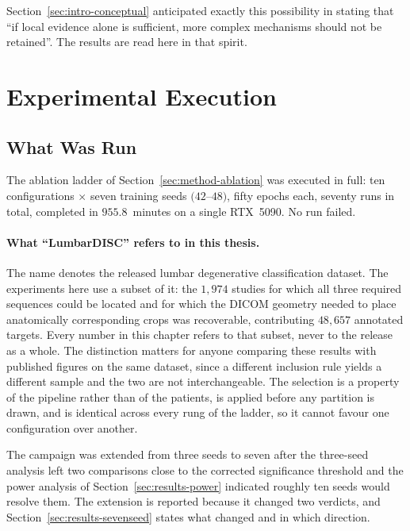 \documentclass[12pt,a4paper]{report}
\begin{document}
Section~\ref{sec:intro-conceptual} anticipated exactly this possibility in
stating that \enquote{if local evidence alone is sufficient, more complex
mechanisms should not be retained}. The results are read here in that spirit.

\section{Experimental Execution}
\label{sec:results-execution}

\subsection{What Was Run}

The ablation ladder of Section~\ref{sec:method-ablation} was executed in full:
ten configurations $\times$ seven training seeds $(42$--$48)$, fifty epochs
each, seventy runs in total, completed in $955.8$~minutes on a single RTX~5090.
No run failed.

\paragraph{What \enquote{LumbarDISC} refers to in this thesis.} The name
denotes the released lumbar degenerative classification dataset. The experiments
here use a subset of it: the $1{,}974$ studies for which all three required
sequences could be located and for which the DICOM geometry needed to place
anatomically corresponding crops was recoverable, contributing $48{,}657$
annotated targets. Every number in this chapter refers to that subset, never to
the release as a whole. The distinction matters for anyone comparing these
results with published figures on the same dataset, since a different inclusion
rule yields a different sample and the two are not interchangeable. The
selection is a property of the pipeline rather than of the patients, is applied
before any partition is drawn, and is identical across every rung of the ladder,
so it cannot favour one configuration over another.

The campaign was extended from three seeds to seven after the three-seed
analysis left two comparisons close to the corrected significance threshold and
the power analysis of Section~\ref{sec:results-power} indicated roughly ten
seeds would resolve them. The extension is reported because it changed two
verdicts, and Section~\ref{sec:results-sevenseed} states what changed and in
which direction.
\end{document}
